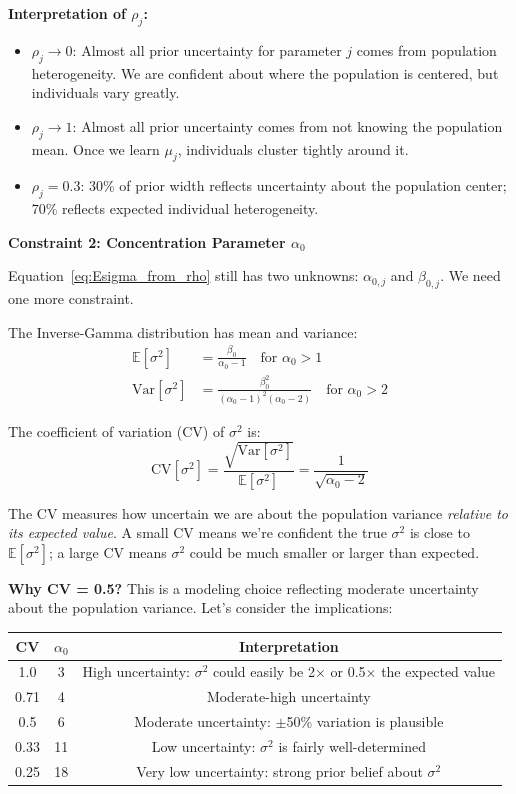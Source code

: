 \documentclass[11pt]{article}
\newcommand{\E}{\mathbb{E}}
\newcommand{\Var}{\text{Var}}
\begin{document}
\textbf{Interpretation of $\rho_j$:}
\begin{itemize}
  \item $\rho_j \to 0$: Almost all prior uncertainty for parameter $j$ comes from population heterogeneity. We are confident about where the population is centered, but individuals vary greatly.
  \item $\rho_j \to 1$: Almost all prior uncertainty comes from not knowing the population mean. Once we learn $\mu_j$, individuals cluster tightly around it.
  \item $\rho_j = 0.3$: 30\% of prior width reflects uncertainty about the population center; 70\% reflects expected individual heterogeneity.
\end{itemize}

\textbf{Constraint 2: Concentration Parameter $\alpha_0$}

Equation~\eqref{eq:Esigma_from_rho} still has two unknowns: $\alpha_{0,j}$ and $\beta_{0,j}$. We need one more constraint.

The Inverse-Gamma distribution has mean and variance:
\begin{align}
  \E[\sigma^2] &= \frac{\beta_0}{\alpha_0 - 1} \quad \text{for } \alpha_0 > 1 \\
  \Var[\sigma^2] &= \frac{\beta_0^2}{(\alpha_0 - 1)^2 (\alpha_0 - 2)} \quad \text{for } \alpha_0 > 2
\end{align}

The coefficient of variation (CV) of $\sigma^2$ is:
\begin{equation}
  \text{CV}[\sigma^2] = \frac{\sqrt{\Var[\sigma^2]}}{\E[\sigma^2]} = \frac{1}{\sqrt{\alpha_0 - 2}}
  \label{eq:cv_ig}
\end{equation}

The CV measures how uncertain we are about the population variance \textit{relative to its expected value}. A small CV means we're confident the true $\sigma^2$ is close to $\E[\sigma^2]$; a large CV means $\sigma^2$ could be much smaller or larger than expected.

\textbf{Why CV = 0.5?} This is a modeling choice reflecting moderate uncertainty about the population variance. Let's consider the implications:
\begin{center}
\begin{tabular}{ccc}
\toprule
CV & $\alpha_0$ & Interpretation \\
\midrule
1.0 & 3 & High uncertainty: $\sigma^2$ could easily be 2$\times$ or 0.5$\times$ the expected value \\
0.71 & 4 & Moderate-high uncertainty \\
0.5 & 6 & Moderate uncertainty: $\pm$50\% variation is plausible \\
0.33 & 11 & Low uncertainty: $\sigma^2$ is fairly well-determined \\
0.25 & 18 & Very low uncertainty: strong prior belief about $\sigma^2$ \\
\bottomrule
\end{tabular}
\end{center}
\end{document}
